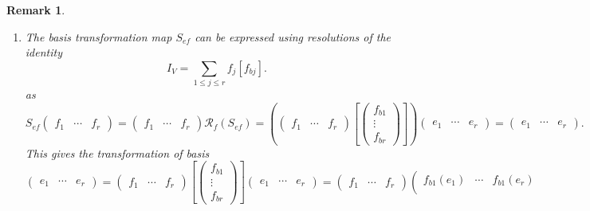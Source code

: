 \documentclass[aps,preprint]{revtex4}
\newtheorem{remark}[theorem]{Remark}
\begin{document}
\begin{remark}
\begin{enumerate}
\begin{enumerate}
\item The basis transformation map $S_{ef}$ can be expressed using
resolutions of the identity 
\begin{equation}
I_{V}=\sum_{1\leq j\leq r}f_{j}\left[ f_{bj}\right] .
\end{equation}%
as%
\begin{equation}
S_{ef}\left( 
\begin{array}{ccc}
f_{1} & \cdots & f_{r}%
\end{array}%
\right) =\left( 
\begin{array}{ccc}
f_{1} & \cdots & f_{r}%
\end{array}%
\right) \mathcal{R}_{f}\left( S_{ef}\right) =\left( \left( 
\begin{array}{ccc}
f_{1} & \cdots & f_{r}%
\end{array}%
\right) \left[ \left( 
\begin{array}{c}
f_{b1} \\ 
\vdots \\ 
f_{br}%
\end{array}%
\right) \right] \right) \left( 
\begin{array}{ccc}
e_{1} & \cdots & e_{r}%
\end{array}%
\right) =\left( 
\begin{array}{ccc}
e_{1} & \cdots & e_{r}%
\end{array}%
\right) .
\end{equation}%
This gives the transformation of basis 
\begin{equation}
\left( 
\begin{array}{ccc}
e_{1} & \cdots & e_{r}%
\end{array}%
\right) =\left( 
\begin{array}{ccc}
f_{1} & \cdots & f_{r}%
\end{array}%
\right) \left[ \left( 
\begin{array}{c}
f_{b1} \\ 
\vdots \\ 
f_{br}%
\end{array}%
\right) \right] \left( 
\begin{array}{ccc}
e_{1} & \cdots & e_{r}%
\end{array}%
\right) =\left( 
\begin{array}{ccc}
f_{1} & \cdots & f_{r}%
\end{array}%
\right) \left( 
\begin{array}{ccc}
f_{b1}\left( e_{1}\right) & \cdots & f_{b1}\left( e_{r}\right) \\ 

\end{array}
\end{equation}
\end{enumerate}
\end{enumerate}
\end{remark}
\end{document}
